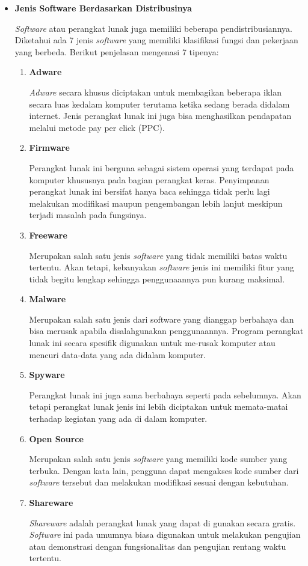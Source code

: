\documentclass[12pt]{article}
\begin{document}
\begin{itemize}
        \item \textbf{Jenis Software Berdasarkan Distribusinya}
        \par
        \textit{Software} atau perangkat lunak juga memiliki beberapa pendistribusiannya. Diketahui ada 7 jenis \textit{software} yang memiliki klasifikasi fungsi dan pekerjaan yang berbeda. Berikut penjelasan mengenasi 7 tipenya:
        \begin{enumerate}
            \item \textbf{Adware}
            \par
            \textit{Adware} secara khusus diciptakan untuk membagikan beberapa iklan secara luas kedalam komputer terutama ketika sedang berada didalam internet.  Jenis perangkat lunak ini juga bisa menghasilkan pendapatan melalui metode pay per click (PPC).
            \item \textbf{Firmware}
            \par
            Perangkat lunak ini berguna sebagai sistem operasi yang terdapat pada komputer khususnya pada bagian perangkat keras. Penyimpanan perangkat lunak ini bersifat hanya baca  sehingga tidak perlu lagi melakukan modifikasi maupun pengembangan lebih lanjut meskipun terjadi masalah pada fungsinya.
            \item \textbf{Freeware}
            \par
            Merupakan salah satu jenis \textit{software} yang tidak memiliki batas waktu tertentu. Akan tetapi, kebanyakan \textit{software} jenis ini memiliki fitur yang tidak begitu lengkap sehingga penggunaannya pun kurang maksimal.
            \item \textbf{Malware}
            \par
            Merupakan salah satu jenis dari software yang dianggap berbahaya dan bisa merusak apabila disalahgunakan penggunaannya. Program perangkat lunak ini secara spesifik digunakan untuk me-rusak komputer atau mencuri data-data yang ada didalam komputer.
            \item \textbf{Spyware}
            \par
            Perangkat lunak ini juga sama berbahaya seperti pada sebelumnya. Akan tetapi perangkat lunak jenis ini lebih diciptakan untuk memata-matai terhadap kegiatan yang ada di dalam komputer.
            \item \textbf{Open Source}
            \par
            Merupakan salah satu jenis \textit{software} yang memiliki kode sumber yang terbuka. Dengan kata lain, pengguna dapat mengakses kode sumber dari \textit{software} tersebut dan melakukan modifikasi sesuai dengan kebutuhan.
            \item \textbf{Shareware}
            \par
            \textit{Shareware} adalah perangkat lunak yang dapat di gunakan secara gratis. \textit{Software} ini pada umumnya biasa digunakan untuk melakukan pengujian atau demonstrasi dengan fungsionalitas dan pengujian rentang waktu tertentu.
        \end{enumerate}
    \end{itemize}
\end{document}
